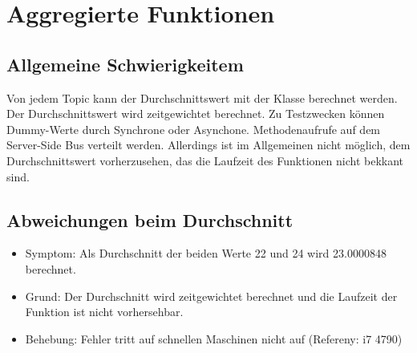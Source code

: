 \documentclass[qualitaetssicherung.tex]{subfiles}
\begin{document}
\section{Aggregierte Funktionen}

	\subsection{Allgemeine Schwierigkeitem} 
		Von jedem Topic kann der Durchschnittswert mit der Klasse \label{Class: AverageComputation} berechnet werden. Der Durchschnittswert wird zeitgewichtet berechnet. Zu Testzwecken können Dummy-Werte durch Synchrone oder Asynchone. Methodenaufrufe auf dem Server-Side Bus verteilt werden. Allerdings ist im Allgemeinen nicht möglich, dem Durchschnittswert vorherzusehen, das die Laufzeit des Funktionen nicht bekkant sind.

	\subsection{Abweichungen beim Durchschnitt}
		\begin{itemize}
			\item
			Symptom: Als Durchschnitt der beiden Werte 22 und 24 wird 23.0000848 berechnet.
			\item
			Grund: Der Durchschnitt wird zeitgewichtet berechnet und die Laufzeit der Funktion ist nicht vorhersehbar.
			\item
			Behebung: Fehler tritt auf schnellen Maschinen nicht auf (Refereny: i7 4790)

		\end{itemize}
\end{document}
